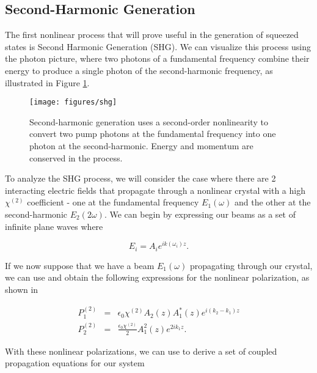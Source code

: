\subsection{Second-Harmonic Generation}
\label{second_harmonic_generation} 

The first nonlinear process that will prove useful in the generation of squeezed
states is Second Harmonic Generation (SHG).  We can visualize this process using the photon picture, where two photons of a fundamental frequency combine their energy to produce a single photon of the second-harmonic frequency, as illustrated in Figure  \ref{fig:shg_photon}.

\begin{figure}[!ht] 
 \centering 
 \texttt{[image: figures/shg]} 
 \caption[Photon model of second-harmonic generation]{Second-harmonic
generation uses a second-order nonlinearity to convert two pump photons at the fundamental frequency into one photon at the second-harmonic.  Energy and momentum are conserved in the process.} 
 \label{fig:shg_photon} 
\end{figure}


To analyze the SHG process, we will consider the case where there are 2 interacting electric fields that propagate through a nonlinear crystal with a high $\chi^{(2)}$  coefficient - one at the fundamental frequency $E_1(\omega ) $ and the other at the second-harmonic $E_2(2\omega )$.  We can begin by expressing our beams as a set of infinite plane waves where 

    
\begin{equation}
  \label{eq:plane_wave_approximation}
  E_i = A_i  e^{ik(\omega_i) z}.
\end{equation}

\noindent
If we now suppose that we have a beam $E_1(\omega)$ propagating through our crystal, we can use  and obtain the following expressions for the nonlinear polarization, as shown in \cite{boyd} 

\begin{eqnarray}
  \label{eq:polar_shg}
  P^{(2)}_1 & = & \epsilon_0 \chi^{(2)} A_2(z) A^*_1(z) e^{i(k_2-k_1)z} \\
  P^{(2)}_2 & = & \frac{\epsilon_0 \chi^{(2)}}{2} A^2_1(z) e^{2ik_1 z}.
\end{eqnarray}

\noindent 
With these nonlinear polarizations, we can use  to derive a set of coupled propagation equations for our system \cite{joffre} 

